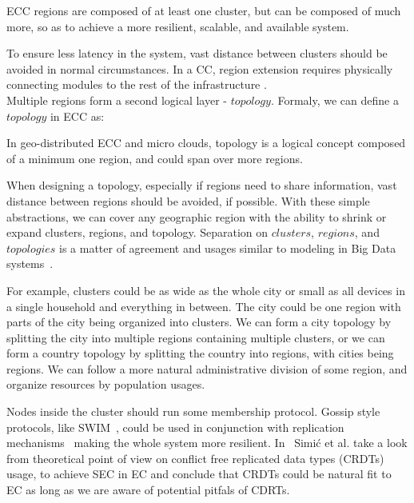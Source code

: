 \begin{definition}
	ECC regions are composed of at least one cluster, but can be composed of much more, so as to achieve a more resilient, scalable, and available system. 
\end{definition}

To ensure less latency in the system, vast distance between clusters should be avoided in normal circumstances. In a CC, region extension requires physically connecting modules to the rest of the infrastructure \cite{Hamilton07}.\\ 

Multiple regions form a second logical layer - $topology$. Formaly, we can define a $topology$ in ECC as:

\begin{definition}
In geo-distributed ECC and micro clouds, topology is a logical concept composed of a minimum one region, and could span over more regions. 
\end{definition}

When designing a topology, especially if regions need to share information, vast distance between regions should be avoided, if possible. With these simple abstractions, we can cover any geographic region with the ability to shrink or expand clusters, regions, and topology. Separation on $clusters$, $regions$, and $topologies$ is a matter of agreement and usages similar to modeling in Big Data systems~\cite{SonbolOAA20, WangCAL14}. 

For example, clusters could be as wide as the whole city or small as all devices in a single household and everything in between. The city could be one region with parts of the city being organized into clusters. We can form a city topology by splitting the city into multiple regions containing multiple clusters, or we can form a country topology by splitting the country into regions, with cities being regions. We can follow a more natural administrative division of some region, and organize resources by population usages.

Nodes inside the cluster should run some membership protocol. Gossip style protocols, like SWIM~\cite{DasGM02}, could be used in conjunction with replication mechanisms~\cite{LiBCL20, CauCBFCEB16,CRDTS_Nuno} making the whole system more resilient. In~\cite{inproceedingsSimic2} Simi\' c et al. take a look from theoretical point of view on conflict free replicated data types (CRDTs) usage, to achieve SEC in EC and conclude that CRDTs could be natural fit to EC as long as we are aware of potential pitfals of CDRTs.

